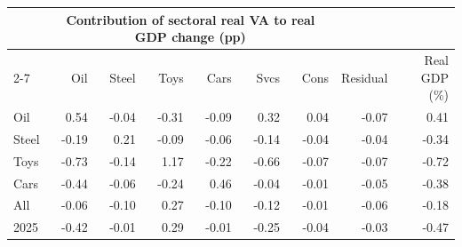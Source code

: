 \begin{tabular}{lrrrrrrrr}
\toprule
 & \multicolumn{6}{c}{Contribution of sectoral real VA to real GDP change (pp)} & & \\
\cmidrule(lr){2-7}
 & Oil & Steel & Toys & Cars & Svcs & Cons & Residual & Real GDP (\%) \\
\midrule
Oil & 0.54 & -0.04 & -0.31 & -0.09 & 0.32 & 0.04 & -0.07 & 0.41 \\
Steel & -0.19 & 0.21 & -0.09 & -0.06 & -0.14 & -0.04 & -0.04 & -0.34 \\
Toys & -0.73 & -0.14 & 1.17 & -0.22 & -0.66 & -0.07 & -0.07 & -0.72 \\
Cars & -0.44 & -0.06 & -0.24 & 0.46 & -0.04 & -0.01 & -0.05 & -0.38 \\
All & -0.06 & -0.10 & 0.27 & -0.10 & -0.12 & -0.01 & -0.06 & -0.18 \\
2025 & -0.42 & -0.01 & 0.29 & -0.01 & -0.25 & -0.04 & -0.03 & -0.47 \\
\bottomrule
\end{tabular}
